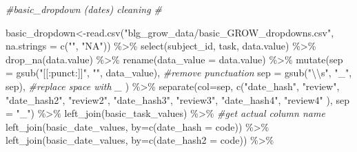 \documentclass[
]{article}
\newenvironment{Shaded}{\begin{snugshade}}{\end{snugshade}}
\newcommand{\AttributeTok}[1]{\textcolor[rgb]{0.77,0.63,0.00}{#1}}
\newcommand{\CommentTok}[1]{\textcolor[rgb]{0.56,0.35,0.01}{\textit{#1}}}
\newcommand{\FunctionTok}[1]{\textcolor[rgb]{0.00,0.00,0.00}{#1}}
\newcommand{\NormalTok}[1]{#1}
\newcommand{\OtherTok}[1]{\textcolor[rgb]{0.56,0.35,0.01}{#1}}
\newcommand{\SpecialCharTok}[1]{\textcolor[rgb]{0.00,0.00,0.00}{#1}}
\newcommand{\StringTok}[1]{\textcolor[rgb]{0.31,0.60,0.02}{#1}}
\begin{document}
\begin{Shaded}
\begin{Highlighting}[]
\CommentTok{\#basic\_dropdown (dates) cleaning \# }

\NormalTok{basic\_dropdown}\OtherTok{\textless{}{-}}\FunctionTok{read.csv}\NormalTok{(}\StringTok{"blg\_grow\_data/basic\_GROW\_dropdowns.csv"}\NormalTok{, }\AttributeTok{na.strings =} \FunctionTok{c}\NormalTok{(}\StringTok{""}\NormalTok{, }\StringTok{"NA"}\NormalTok{)) }\SpecialCharTok{\%\textgreater{}\%}
  \FunctionTok{select}\NormalTok{(subject\_id, task, }\StringTok{\textquotesingle{}data.value\textquotesingle{}}\NormalTok{) }\SpecialCharTok{\%\textgreater{}\%}
  \FunctionTok{drop\_na}\NormalTok{(}\StringTok{\textquotesingle{}data.value\textquotesingle{}}\NormalTok{) }\SpecialCharTok{\%\textgreater{}\%} 
  \FunctionTok{rename}\NormalTok{(}\AttributeTok{data\_value =} \StringTok{\textquotesingle{}data.value\textquotesingle{}}\NormalTok{) }\SpecialCharTok{\%\textgreater{}\%} 
  \FunctionTok{mutate}\NormalTok{(}\AttributeTok{sep =} \FunctionTok{gsub}\NormalTok{(}\StringTok{"[[:punct:]]"}\NormalTok{, }\StringTok{""}\NormalTok{, data\_value), }\CommentTok{\#remove punctuation }
        \AttributeTok{sep =} \FunctionTok{gsub}\NormalTok{(}\StringTok{"}\SpecialCharTok{\textbackslash{}\textbackslash{}}\StringTok{s"}\NormalTok{, }\StringTok{"\_"}\NormalTok{, sep),  }\CommentTok{\#replace space with \_}
\NormalTok{        ) }\SpecialCharTok{\%\textgreater{}\%} 
  \FunctionTok{separate}\NormalTok{(}\AttributeTok{col=}\NormalTok{sep, }\FunctionTok{c}\NormalTok{(}\StringTok{"date\_hash"}\NormalTok{, }\StringTok{"review"}\NormalTok{, }\StringTok{"date\_hash2"}\NormalTok{, }\StringTok{"review2"}\NormalTok{, }\StringTok{"date\_hash3"}\NormalTok{, }\StringTok{"review3"}\NormalTok{, }\StringTok{"date\_hash4"}\NormalTok{, }\StringTok{"review4"}\NormalTok{ ), }\AttributeTok{sep =} \StringTok{"\_"}\NormalTok{) }\SpecialCharTok{\%\textgreater{}\%}
                \FunctionTok{left\_join}\NormalTok{(basic\_task\_values) }\SpecialCharTok{\%\textgreater{}\%} \CommentTok{\#get actual column name }
                  \FunctionTok{left\_join}\NormalTok{(basic\_date\_values, }\AttributeTok{by=}\FunctionTok{c}\NormalTok{(}\StringTok{\textquotesingle{}date\_hash\textquotesingle{}} \OtherTok{=} \StringTok{\textquotesingle{}code\textquotesingle{}}\NormalTok{)) }\SpecialCharTok{\%\textgreater{}\%} 
                    \FunctionTok{left\_join}\NormalTok{(basic\_date\_values, }\AttributeTok{by=}\FunctionTok{c}\NormalTok{(}\StringTok{\textquotesingle{}date\_hash2\textquotesingle{}} \OtherTok{=} \StringTok{\textquotesingle{}code\textquotesingle{}}\NormalTok{))  }\SpecialCharTok{\%\textgreater{}\%} 

\end{Highlighting}
\end{Shaded}
\end{document}
